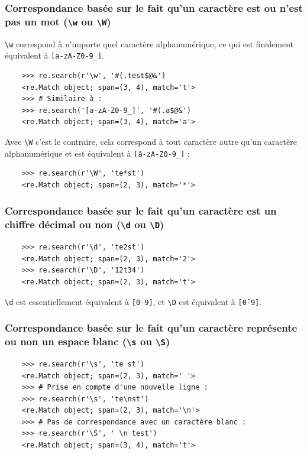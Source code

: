 \documentclass[a4paper,12pt]{book}
\begin{document}
\subsubsection*{Correspondance basée sur le fait qu'un caractère est ou n'est pas un mot (\texttt{\textbackslash{}w} ou \texttt{\textbackslash{}W})}
\texttt{\textbackslash{}w} correspond à n'importe quel caractère alphanumérique, ce qui est finalement équivalent à \texttt{[a-zA-Z0-9\_]}.
\begin{verbatim}
    >>> re.search(r'\w', '#(.test$@&')
    <re.Match object; span=(3, 4), match='t'>
    >>> # Similaire à :
    >>> re.search('[a-zA-Z0-9_]', '#(.a$@&')
    <re.Match object; span=(3, 4), match='a'>
\end{verbatim}
\medskip

Avec \texttt{\textbackslash{}W} c'est le contraire, cela correspond à tout caractère autre qu'un caractère alphanumérique et est équivalent à \texttt{[\^a-zA-Z0-9\_]} :
\begin{verbatim}
    >>> re.search(r'\W', 'te*st')
    <re.Match object; span=(2, 3), match='*'>
\end{verbatim}
\medskip

\subsubsection*{Correspondance basée sur le fait qu'un caractère est un chiffre décimal ou non (\texttt{\textbackslash{}d} ou \texttt{\textbackslash{}D})}
\begin{verbatim}
    >>> re.search(r'\d', 'te2st')
    <re.Match object; span=(2, 3), match='2'>
    >>> re.search(r'\D', '12t34')
    <re.Match object; span=(2, 3), match='t'>
\end{verbatim}
\medskip

\texttt{\textbackslash{}d} est essentiellement équivalent à \texttt{[0-9]}, et \texttt{\textbackslash{}D} est équivalent à \texttt{[\^0-9]}.
\medskip

\subsubsection*{Correspondance basée sur le fait qu'un caractère représente ou non un espace blanc (\texttt{\textbackslash{}s} ou \texttt{\textbackslash{}S})}
\begin{verbatim}
    >>> re.search(r'\s', 'te st')
    <re.Match object; span=(2, 3), match=' '>
    >>> # Prise en compte d'une nouvelle ligne :
    >>> re.search(r'\s', 'te\nst')
    <re.Match object; span=(2, 3), match='\n'>
    >>> # Pas de correspondance avec un caractère blanc :
    >>> re.search(r'\S', ' \n test')
    <re.Match object; span=(3, 4), match='t'>
\end{verbatim}
\medskip
\end{document}
